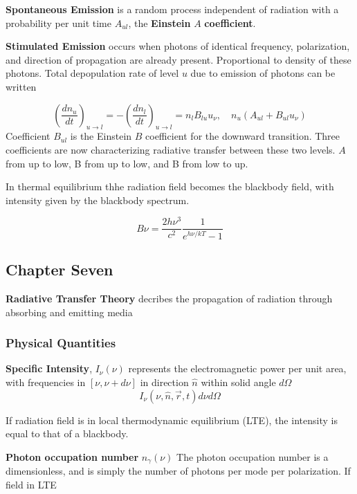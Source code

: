 \textbf{Spontaneous Emission} is a random process independent of radiation with a probability per unit time $ A_{ul} $, the \textbf{Einstein }$ A $ \textbf{coefficient}.

\textbf{Stimulated Emission} occurs when photons of identical frequency, polarization, and direction of propagation are already present. Proportional to density of these photons. Total depopulation rate of level $ u $  due to emission of photons can be written

\begin{equation}
  {(\frac{dn_{u}}{dt})}_{u\to l}= -{(\frac{dn_{l}}{dt})}_{u\to l} = n_{l}B_{lu}u_{\nu},\quad n_{u}(A_{ul}+B_{ul}u_{\nu})
\end{equation}
Coefficient $ B_{ul} $ is the Einstein $ B $ coefficient for the downward transition. Three coefficients are now characterizing radiative transfer between these two levels. $ A $ from up to low, B from up to low, and B from low to up. 

In thermal equilibrium thhe radiation field becomes the blackbody field, with intensity given by the blackbody spectrum.

\begin{equation}
  B\nu = \frac{2h\nu^{3}}{c^2}\frac{1}{e^{h\nu/kT}-1}
\end{equation}




\subsection{Chapter Seven}
\textbf{Radiative Transfer Theory} decribes the propagation of radiation through absorbing and emitting media
\subsubsection{Physical Quantities}
\textbf{Specific Intensity}, $ I_{\nu}(\nu) $ represents the electromagnetic power per unit area, with frequencies in $ [\nu,\nu + d\nu] $  in direction $ \hat{n} $ within solid angle $ d\Omega $
\begin{equation}
   I_{\nu}(\nu,\hat{n},\vec{r},t) d\nu d\Omega
\end{equation}

If radiation field is in local thermodynamic equilibrium (LTE), the intensity is equal to that of a blackbody.

\textbf{Photon occupation number} $ n_{\gamma}(\nu) $ 
The photon occupation number is a dimensionless, and is simply the number of photons per mode per polarization. If field in LTE

